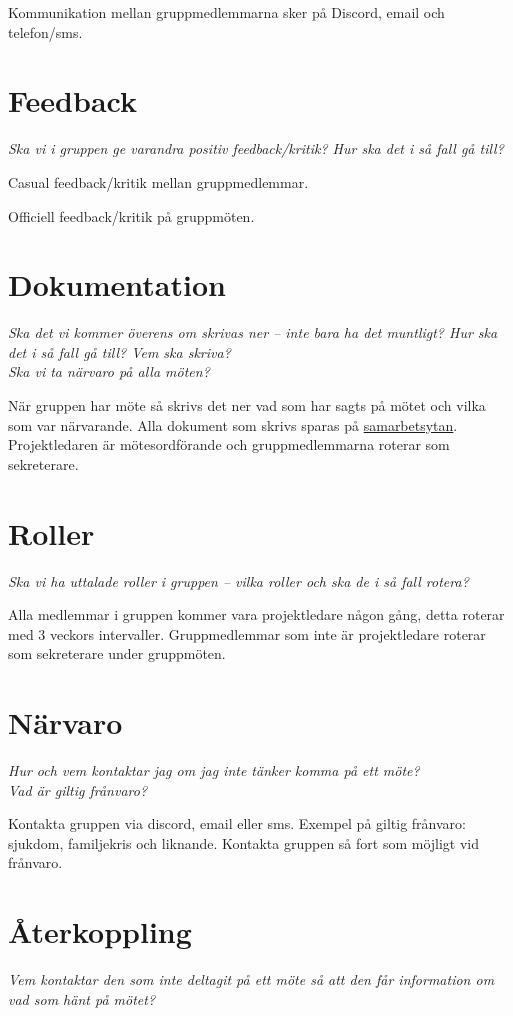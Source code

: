 Kommunikation mellan gruppmedlemmarna sker på Discord, email och telefon/sms.

\section*{Feedback}
\textit{Ska vi i gruppen ge varandra positiv feedback/kritik? Hur ska det i så fall gå till?}

Casual feedback/kritik mellan gruppmedlemmar.

Officiell feedback/kritik på gruppmöten.

\section*{Dokumentation}
\textit{Ska det vi kommer överens om skrivas ner – inte bara ha det muntligt? Hur ska det i så fall gå till? Vem ska skriva? \\
Ska vi ta närvaro på alla möten?}

När gruppen har möte så skrivs det ner vad som har sagts på mötet och vilka som var närvarande. Alla dokument som skrivs sparas på \href{https://github.com/anhility/DVA227}{samarbetsytan}. Projektledaren är mötesordförande och gruppmedlemmarna roterar som sekreterare.

\section*{Roller}
\textit{Ska vi ha uttalade roller i gruppen – vilka roller och ska de i så fall rotera?}

Alla medlemmar i gruppen kommer vara projektledare någon gång, detta roterar med 3 veckors intervaller. Gruppmedlemmar som inte är projektledare roterar som sekreterare under gruppmöten.

\section*{Närvaro}
\textit{Hur och vem kontaktar jag om jag inte tänker komma på ett möte? \\
Vad är giltig frånvaro?}

Kontakta gruppen via discord, email eller sms. Exempel på giltig frånvaro: sjukdom, familjekris och liknande. Kontakta gruppen så fort som möjligt vid frånvaro.

\section*{Återkoppling}
\textit{Vem kontaktar den som inte deltagit på ett möte så att den får information om vad som hänt på mötet?}

